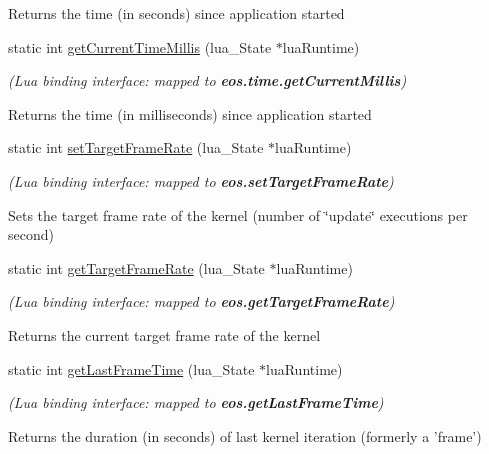 \begin{CompactItemize}
\begin{CompactList}
\par
 Returns the time (in seconds) since application started \item\end{CompactList}\item 
static int \hyperlink{structEOSKernel_3b68f7decae2685ffa3137f290656a1e}{getCurrentTimeMillis} (lua\_\-State $\ast$luaRuntime)
\begin{CompactList}\small\item\em {\em (Lua binding interface: mapped to {\bf eos.time.getCurrentMillis})\/}\par
\par
 Returns the time (in milliseconds) since application started \item\end{CompactList}\item 
static int \hyperlink{structEOSKernel_66a2b6a361992f0fb4c6e51c345e4811}{setTargetFrameRate} (lua\_\-State $\ast$luaRuntime)
\begin{CompactList}\small\item\em {\em (Lua binding interface: mapped to {\bf eos.setTargetFrameRate})\/}\par
\par
 Sets the target frame rate of the kernel (number of \char`\"{}update\char`\"{} executions per second) \item\end{CompactList}\item 
static int \hyperlink{structEOSKernel_38b029c0f4c889658b15b1fd87404934}{getTargetFrameRate} (lua\_\-State $\ast$luaRuntime)
\begin{CompactList}\small\item\em {\em (Lua binding interface: mapped to {\bf eos.getTargetFrameRate})\/}\par
\par
 Returns the current target frame rate of the kernel \item\end{CompactList}\item 
static int \hyperlink{structEOSKernel_d47c8cea2665110c5da64b2af16e49ac}{getLastFrameTime} (lua\_\-State $\ast$luaRuntime)
\begin{CompactList}\small\item\em {\em (Lua binding interface: mapped to {\bf eos.getLastFrameTime})\/}\par
\par
 Returns the duration (in seconds) of last kernel iteration (formerly a 'frame') \item\end{CompactList}\item 

\end{CompactItemize}
